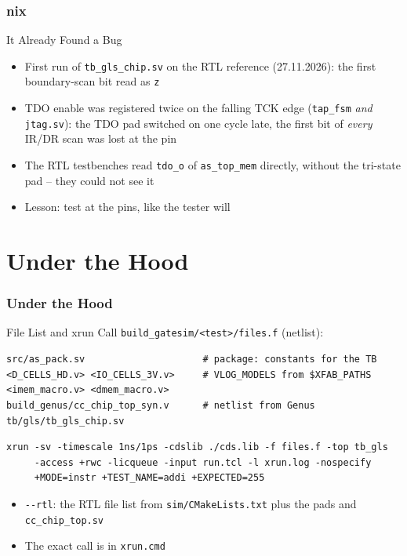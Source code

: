 \documentclass{beamer}
\newcommand{\astitle}{nix}
\newcommand{\assubtitle}{nix}
\newcommand{\cmd}[1]{\texttt{#1}}
\begin{document}
\renewcommand{\assubtitle}{It Already Found a Bug}
\begin{frame}
\frametitle{\astitle}
\begin{block}{\assubtitle}
  \begin{itemize}
    \item First run of \cmd{tb\_gls\_chip.sv} on the RTL reference
      (27.11.2026): the first boundary-scan bit read as \cmd{z}
    \item TDO enable was registered twice on the falling TCK edge
      (\cmd{tap\_fsm} \emph{and} \cmd{jtag.sv}): the TDO pad switched on one
      cycle late, the first bit of \emph{every} IR/DR scan was lost at the pin
    \item The RTL testbenches read \cmd{tdo\_o} of \cmd{as\_top\_mem}
      directly, without the tri-state pad -- they could not see it
    \item Lesson: test at the pins, like the tester will
  \end{itemize}
\end{block}
\end{frame}

\section{Under the Hood}
\renewcommand{\astitle}{Under the Hood}

\renewcommand{\assubtitle}{File List and xrun Call}
\begin{frame}[fragile]
\frametitle{\astitle}
\begin{block}{\assubtitle}
  \cmd{build\_gatesim/<test>/files.f} (netlist):
\begin{lstlisting}
src/as_pack.sv                     # package: constants for the TB
<D_CELLS_HD.v> <IO_CELLS_3V.v>     # VLOG_MODELS from $XFAB_PATHS
<imem_macro.v> <dmem_macro.v>
build_genus/cc_chip_top_syn.v      # netlist from Genus
tb/gls/tb_gls_chip.sv
\end{lstlisting}
\begin{lstlisting}[style=out]
xrun -sv -timescale 1ns/1ps -cdslib ./cds.lib -f files.f -top tb_gls
     -access +rwc -licqueue -input run.tcl -l xrun.log -nospecify
     +MODE=instr +TEST_NAME=addi +EXPECTED=255
\end{lstlisting}
  \scriptsize
  \begin{itemize}
    \item \cmd{-{}-rtl}: the RTL file list from \cmd{sim/CMakeLists.txt}
      plus the pads and \cmd{cc\_chip\_top.sv}
    \item The exact call is in \cmd{xrun.cmd}
  \end{itemize}
\end{block}
\end{frame}
\end{document}
